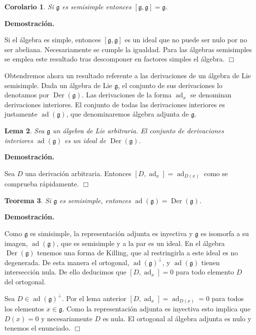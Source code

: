 \documentclass[a4paper,draft,12pt]{scrartcl}
\newtheorem{teo}{Teorema}[section]%
\newtheorem{lema}[teo]{Lema}%
\newtheorem{cor}[teo]{Corolario}%
\newcommand{\dem}{\noindent \textbf{Demostración. }\vspace{0.3 cm}}%
\newcommand{\g}{\mathfrak{g}}%
\newcommand{\fin}{ $\Box $ \vspace{0.4 cm}}
\newcommand{\df}[1]{\textsf{\color{blue}#1}}
\DeclareMathOperator{\Der}{Der}%
\DeclareMathOperator{\ad}{ad}  %
\begin{document}
\begin{cor}

Si $\g$ es semisimple entonces $[\g,\g]=\g$.

\end{cor}

\dem

Si el álgebra es simple, entonces $[\g,\g]$ es un ideal que no puede ser nulo por no ser abeliana.  Necesariamente se cumple la igualdad. Para las álgebras semisimples se emplea este resultado tras descomponer en factores simples el álgebra.  \fin

Obtendremos ahora un resultado referente a las derivaciones de un álgebra de Lie semisimple.  Dada un álgebra de Lie $\g$, el conjunto de sus derivaciones lo denotamos por $\Der(\g)$.  Las derivaciones de la forma $\ad_x$ se denominan derivaciones interiores.  El conjunto de todas las derivaciones interiores es justamente $\ad(\g)$, que denominaremos  \df{álgebra adjunta}  de $\g$.  

\begin{lema}

Sea $\g$ un  álgebra de Lie arbitraria.  El conjunto de derivaciones interiores $\ad(\g)$ es un ideal de $\Der(\g)$.

\end{lema}

\dem

Sea $D$ una derivación arbitraria.  Entonces $[D, \ad_x]= \ad_{D(x)}$ como se comprueba rápidamente.  \fin

\begin{teo}

Si $\g$ es semisimple, entonces $\ad(\g)= \Der(\g)$.  

\end{teo}

\dem

Como $\g$ es simisimple, la representación adjunta es inyectiva y $\g$ es isomorfa a su imagen, $\ad(\g)$, que es semisimple y a la par es un ideal.  En el álgebra $\Der(\g)$ tenemos una forma de Killing, que al restringirla a este ideal es no degenerada.  De esta manera el ortogonal, $\ad(\g)^\perp$, y $\ad(\g)$ tienen intersección nula.    De ello deducimos que $[D, \ad_x]=0$ para todo elemento $D$ del ortogonal. 

Sea $D\in \ad(\g)^\perp$.  Por el lema anterior $[D,\ad_x]= \ad_{D(x)}=0$ para todos los elementos $x \in \g$. Como la representación adjunta es inyectiva esto implica que $D(x)=0$ y necesariamente $D$ es nula.  El ortogonal al álgebra adjunta es nulo y tenemos el enunciado. \fin
\end{document}
